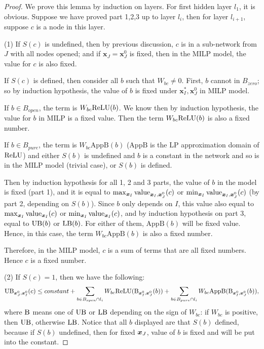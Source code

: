			\begin{proof}
				We prove this lemma by induction on layers. For first hidden layer $l_1$, it is obvious. Suppose we have proved part 1,2,3 up to layer $l_i$, then for layer $l_{i+1}$, suppose $c$ is a node in this layer. 
				
				(1)	If $S(c)$ is undefined, then by previous discussion, $c$ is in a sub-network from $J$ with all nodes opened; and if $\boldsymbol{x}_J=\boldsymbol{x}_J^0$ is fixed, then in the MILP model, the value for $c$ is also fixed. 
				
				If $S(c)$ is defined, then consider all $b$ such that $W_{bc}\neq 0$. First, $b$ cannot in $B_{zero}$; so by induction hypothesis, the value of $b$ is fixed under $\boldsymbol{x}^*_I,\boldsymbol{x}^0_J$ in MILP model. 
				
				
				
				If $b\in B_{open}$, the term is $W_{bc}\mathrm{ReLU}(b)$. We know then by induction hypothesis, the value for $b$ in MILP is a fixed value. Then the term $W_{bc}\mathrm{ReLU}(b)$ is also a fixed number.  
				
				If $b\in B_{pure}$, the term is $W_{bc}\mathrm{AppB}(b)$ ($\mathrm{AppB}$ is the LP approximation domain of $\mathrm{ReLU}$) and either $S(b)$ is undefined and $b$ is a constant in the network and so is in the MILP model (trivial case), or $S(b)$ is defined. 
				
				Then by induction hypothesis for all 1, 2 and 3 parts,  the value of $b$ in the model is fixed (part 1), and it is equal to $\max_{\boldsymbol{x}_I} {\textrm{value}}_{\boldsymbol{x}_I,\boldsymbol{x}^0_J}(c)$ or $\min_{\boldsymbol{x}_I} {\textrm{value}}_{\boldsymbol{x}_I,\boldsymbol{x}^0_J}(c)$ (by part 2, depending on $S(b)$). Since $b$ only depends on $I$, this value also equal to $\max_{\boldsymbol{x}_I} {\textrm{value}}_{\boldsymbol{x}_I}(c)$ or $\min_{\boldsymbol{x}_I} {\textrm{value}}_{\boldsymbol{x}_I}(c)$, and by induction hypothesis on part 3, equal to $\mathrm{UB}(b)$ or $\mathrm{LB}(b)$. For either of them, $\mathrm{AppB}(b)$ will be fixed value. Hence, in this case, the term $W_{bc}\mathrm{AppB}(b)$ is also a fixed number.
				
				Therefore, in the MILP model, $c$ is a sum of terms that are all fixed numbers. Hence $c$ is a fixed number.
				
				(2) If $S(c)=1$, then we have the following:	\begin{align*}
					\mathrm{UB}_{\boldsymbol{x}^0_J,\boldsymbol{x}^0_I}(c) \leq constant + \sum_{b\in B_{open}\cap l_i} W_{bc}\mathrm{ReLU}(\mathrm{B}_{\boldsymbol{x}^0_I,\boldsymbol{x}^0_J}(b)) + \sum_{b\in B_{pure}\cap l_{i}} W_{bc} \mathrm{AppB}(\mathrm{B}_{\boldsymbol{x}^0_I,\boldsymbol{x}^0_J}(b)),
				\end{align*}where $\mathrm{B}$ means one of $\mathrm{UB}$ or $\mathrm{LB}$ depending on the sign of $W_{bc}$: if $W_{bc}$ is positive, then $\mathrm{UB}$, otherwise $\mathrm{LB}$. Notice that all $b$ displayed are that $S(b)$ defined, because if $S(b)$ undefined, then for fixed $\boldsymbol{x}_J$, value of $b$ is fixed and will be put into the constant.
				

\end{proof}
